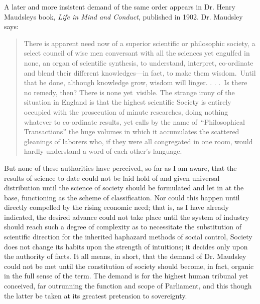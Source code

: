 \documentclass[openany,nobib]{tufte-book}
\begin{document}
A later and more insistent demand of the same order appears in Dr. Henry
Maudsley\textquotesingle s book, \emph{Life in Mind and Conduct},
published in 1902. Dr. Maudsley says:

\begin{quote}
There is apparent need now of a superior scientific or philosophic
society, a select council of wise men conversant with all the sciences
yet engulfed in none, an organ of scientific synthesis, to understand,
interpret, co-ordinate and blend their different knowledges---in fact,
to make them wisdom.~Until that be done, although knowledge grow, wisdom
will linger. . . .~Is there no remedy, then? There is none yet~visible.
The strange irony of the situation in England is that the highest
scientific Society is entirely occupied with the prosecution of minute
researches, doing nothing whatever to co-ordinate results, yet calls by
the name of~``Philosophical Transactions'' the huge volumes in which it
accumulates the scattered gleanings of laborers who, if they were all
congregated in one room, would hardly understand a word of each other's
language.
\end{quote}

But none of these authorities have perceived, so far as I am aware, that
the results of science to date could not be laid hold of and given
universal distribution until the science of society should be formulated
and let in at the base, functioning as the scheme of classification. Nor
could this happen until directly compelled by the rising economic need;
that is, as I have already indicated, the desired advance could not take
place until the system of industry should reach such a degree of
complexity as to necessitate the substitution of scientific direction
for the inherited haphazard methods of social control, Society does not
change its habits upon the strength of intuitions; it decides only upon
the authority of facts. It all means, in short, that the demand of Dr.
Maudsley could not be met until the constitution of society should
become, in fact, organic in the full sense of the term. The demand is
for the highest human tribunal yet conceived, far outrunning the
function and scope of Parliament, and this though the latter be taken at
its greatest pretension to sovereignty.~
\end{document}
